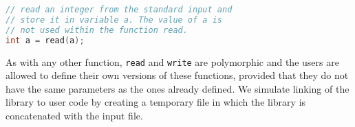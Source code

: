 \begin{lstlisting}[language=C]
// read an integer from the standard input and
// store it in variable a. The value of a is
// not used within the function read.
int a = read(a);
\end{lstlisting}

As with any other function, \texttt{read} and \texttt{write} are polymorphic and the users are
allowed to define their own versions of these functions, provided that they do not have the same parameters
as the ones already defined. We simulate linking of the library to user code by creating a temporary file
in which the library is concatenated with the input file.

